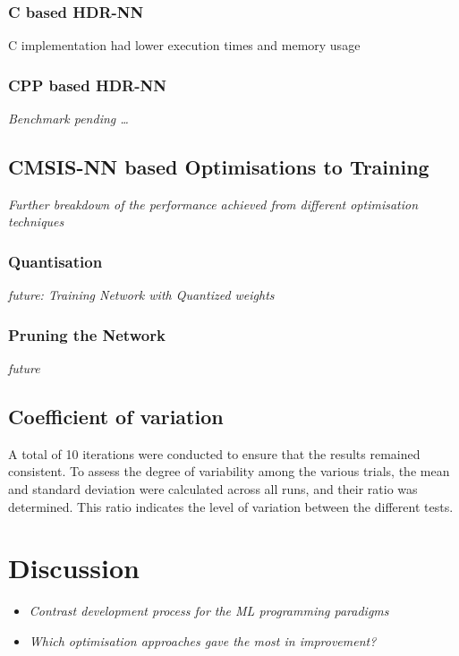 \subsection[C]{C based HDR-NN}

C implementation had lower execution times and memory usage

\subsection[CPP - Eigen]{CPP based HDR-NN}
\textit{Benchmark pending \dots}

\section{CMSIS-NN based Optimisations to Training}
\textit{Further breakdown of the performance achieved from different optimisation techniques}

\subsection{Quantisation}
\textit{future: Training Network with Quantized weights}

\subsection{Pruning the Network}
\textit{future}

\section{Coefficient of variation}
A total of 10 iterations were conducted to ensure that the results remained consistent. To assess the degree of variability among the various trials, the mean and standard deviation were calculated across all runs, and their ratio was determined. This ratio indicates the level of variation between the different tests.

\chapter{Discussion}

\begin{itemize}
	\item \textit{Contrast development process for the ML programming paradigms}
	\item \textit{Which optimisation approaches gave the most in improvement?}
\end{itemize}


